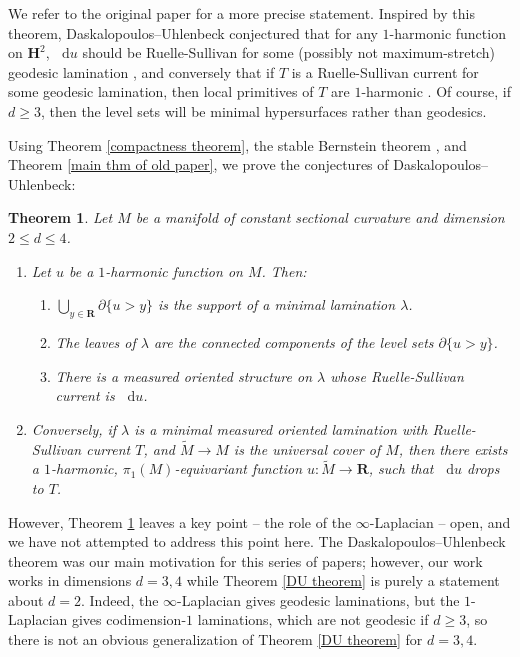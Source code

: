 \documentclass[reqno,11pt]{amsart}
\newcommand{\RR}{\mathbf{R}}
\newcommand{\Hyp}{\mathbf H}
\newcommand*\dif{\mathop{}\!\mathrm{d}}
\newtheorem{theorem}{Theorem}[section]
\theoremstyle{definition}
\numberwithin{equation}{section}
\begin{document}
We refer to the original paper \cite{daskalopoulos2020transverse} for a more precise statement.
Inspired by this theorem, Daskalopoulos--Uhlenbeck conjectured that for any $1$-harmonic function on $\Hyp^2$, $\dif u$ should be Ruelle-Sullivan for some (possibly not maximum-stretch) geodesic lamination \cite[Problem 9.4]{daskalopoulos2020transverse}, and conversely that if $T$ is a Ruelle-Sullivan current for some geodesic lamination, then local primitives of $T$ are $1$-harmonic \cite[Conjecture 9.5]{daskalopoulos2020transverse}.
Of course, if $d \geq 3$, then the level sets will be minimal hypersurfaces rather than geodesics.

Using Theorem \ref{compactness theorem}, the stable Bernstein theorem \cite{Schoen2016, Chodosh2021}, and Theorem \ref{main thm of old paper}, we prove the conjectures of Daskalopoulos--Uhlenbeck:

\begin{theorem}\label{main thm}
Let $M$ be a manifold of constant sectional curvature and dimension $2 \leq d \leq 4$.
\begin{enumerate}
\item Let $u$ be a $1$-harmonic function on $M$.
Then:
\begin{enumerate}
\item $\bigcup_{y \in \RR} \partial \{u > y\}$ is the support of a minimal lamination $\lambda$.
\item The leaves of $\lambda$ are the connected components of the level sets $\partial \{u > y\}$.
\item There is a measured oriented structure on $\lambda$ whose Ruelle-Sullivan current is $\dif u$.
\end{enumerate}
\item Conversely, if $\lambda$ is a minimal measured oriented lamination with Ruelle-Sullivan current $T$, and $\tilde M \to M$ is the universal cover of $M$, then there exists a $1$-harmonic, $\pi_1(M)$-equivariant function $u: \tilde M \to \RR$, such that $\dif u$ drops to $T$.
\end{enumerate}
\end{theorem}

However, Theorem \ref{main thm} leaves a key point -- the role of the $\infty$-Laplacian -- open, and we have not attempted to address this point here.
The Daskalopoulos--Uhlenbeck theorem was our main motivation for this series of papers; however, our work works in dimensions $d = 3, 4$ while Theorem \ref{DU theorem} is purely a statement about $d = 2$.
Indeed, the $\infty$-Laplacian gives geodesic laminations, but the $1$-Laplacian gives codimension-$1$ laminations, which are not geodesic if $d \geq 3$, so there is not an obvious generalization of Theorem \ref{DU theorem} for $d = 3, 4$.
\end{document}
